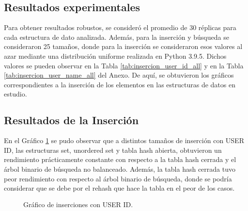 \begin{multicols}{2}
\section{Resultados experimentales}
Para obtener resultados robustos, se consideró el promedio de 30 réplicas para cada estructura de dato analizada. Además, para la inserción y búsqueda se consideraron 25 tamaños, donde para la inserción se consideraron esos valores al azar mediante una distribución uniforme realizada en Python 3.9.5. Dichos valores se pueden observar en la Tabla \ref{tab:insercion_user_id_all} y en la Tabla \ref{tab:insercion_user_name_all} del Anexo. De aquí, se obtuvieron los gráficos correspondientes a la inserción de los elementos en las estructuras de datos en estudio.
\subsection{Resultados de la Inserción}
En el Gráfico \ref{fig:inserciones_user_id} se pudo observar que a distintos tamaños de inserción con USER ID, las estructuras set, unordered set y tabla hash abierta, obtuvieron un rendimiento prácticamente constante con respecto a la tabla hash cerrada y el árbol binario de búsqueda no balanceado. Además, la tabla hash cerrada tuvo peor rendimiento con respecto al árbol binario de búsqueda, donde se podría considerar que se debe por el rehash que hace la tabla en el peor de los casos.
\begin{figure}[H]
    \centering
    
    \caption{Gráfico de inserciones con USER ID.}
    \label{fig:inserciones_user_id}
\end{figure}


\end{multicols}
